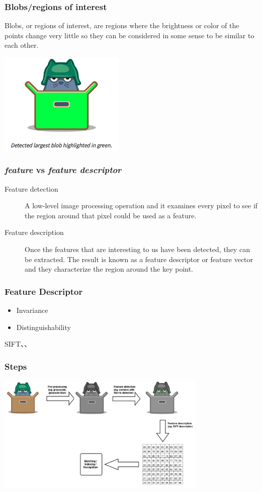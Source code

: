 \documentclass[notheorems,serif,table,compress]{beamer}  %
\begin{document}
\begin{frame}
\frametitle{Blobs/regions of interest}
Blobs, or regions of interest, are regions where the brightness or color of the points change very little so they can be considered in some sense to be similar to each other.

\centering\includegraphics[width=6cm]{blob}
\end{frame}


\begin{frame}
\frametitle{\emph{feature} vs \emph{feature descriptor}}
\begin{description}
\item[Feature detection] A low-level image processing operation and it examines every pixel to see if the region around that pixel could be used as a feature.
\item[Feature description] Once the features that are interesting to us have been detected, they can be extracted. The result is known as a feature descriptor or feature vector and they characterize the region around the key point.
\end{description}
\end{frame}


\begin{frame}
\frametitle{Feature Descriptor}
\begin{itemize}
\item Invariance
\item Distinguishability
\end{itemize}
SIFT、、
\end{frame}


\begin{frame}
\frametitle{Steps}
\centering\includegraphics[width=10cm]{steps}
\end{frame}
\end{document}
